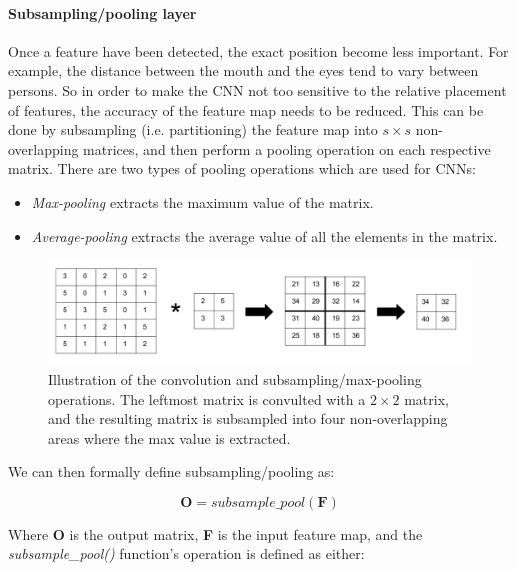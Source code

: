\paragraph{Subsampling/pooling layer}  \hfill \break
Once a feature have been detected, the exact position become less important. For example, the distance between the mouth and the eyes tend to vary between persons. So in order to make the CNN not too sensitive to the relative placement of features, the accuracy of the feature map needs to be reduced. This can be done by subsampling (i.e. partitioning) the feature map into $ s \times s $ non-overlapping matrices, and then perform a pooling operation on each respective matrix. There are two types of pooling operations which are used for CNNs: 

\begin{itemize}
	\item \textit{Max-pooling} extracts the maximum value of the matrix.
	\item \textit{Average-pooling} extracts the average value of all the elements in the matrix.
\end{itemize}

\begin{figure}[h!]
  \centering
      \includegraphics[width=1.0\textwidth]{Figures/Background/Convolution-Maxpooling}
  \caption{Illustration of the convolution and subsampling/max-pooling operations. The leftmost matrix is convulted with a $ 2 \times 2 $ matrix, and the resulting matrix is subsampled into four non-overlapping areas where the max value is extracted.}
  \label{fig_conv_ss_mp}
\end{figure}

\hfill \break

We can then formally define subsampling/pooling as:

\begin{equation}
	\mathbf{O} = subsample\_pool(\mathbf{F})
\end{equation}


Where \textbf{O} is the output matrix, \textbf{F} is the input feature map, and the \textit{subsample\_pool()} function's operation is defined as either:

